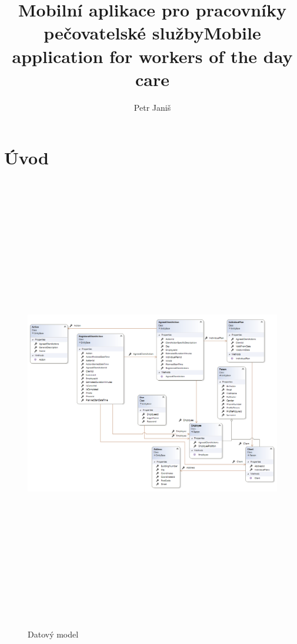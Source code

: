 \documentclass[
  biblatex,
  glossaries,
  index
]{kidiplom}
\title{Mobilní aplikace pro pracovníky pečovatelské služby}
\title[english]{Mobile application for workers of the day care}
\author{Petr Janiš}
\begin{document}
\maketitle

\section{Úvod}
\begin{figure}[hbt]
  \includegraphics[width=14cm,height=20cm,keepaspectratio]{datovy_model}
  \caption{Datový model}
\end{figure}
\newpage
\end{document}
